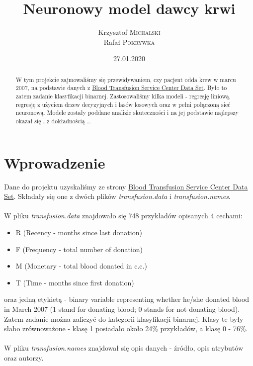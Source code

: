 \documentclass[11pt, a4paper, notitlepage]{report}
\author{Krzysztof \textsc{Michalski} \\ Rafał \textsc{Pokrywka} }
\title{\textbf{Neuronowy model dawcy krwi}}
\date{27.01.2020}
\begin{document}
\clearpage\maketitle
\thispagestyle{empty}
\begin{abstract}
	W tym projekcie zajmowaliśmy się przewidywaniem, czy pacjent odda krew w marcu 2007, na podstawie danych z \href{https://archive.ics.uci.edu/ml/datasets/Blood+Transfusion+Service+Center/}{Blood Transfusion Service Center Data Set}.
	Było to zatem zadanie klasyfikacji binarnej. Zastosowaliśmy kilka modeli - regresję liniową, regresję z użyciem drzew decyzyjnych i lasów losowych oraz w pełni połączoną sieć neuronową. Modele zostały poddane analizie skuteczności i na jej podstawie
	najlepszy okazał się \ldots z dokładnością \ldots
\end{abstract}

\clearpage \tableofcontents
\thispagestyle{empty}

\setcounter{page}{1}

\chapter{Wprowadzenie}
	Dane do projektu uzyskaliśmy ze strony \href{https://archive.ics.uci.edu/ml/datasets/Blood+Transfusion+Service+Center/}{Blood Transfusion Service Center Data Set}. Składały się one z dwóch plików {\it transfusion.data} i {\it transfusion.names}.\\ \\
	W pliku  {\it transfusion.data} znajdowało się 748 przykładów opisanych 4 cechami:
	\begin{itemize}
	  \item R (Recency - months since last donation)
	  \item F (Frequency - total number of donation)
	  \item M (Monetary - total blood donated in c.c.)
	 \item T (Time - months since first donation)
	\end{itemize} oraz jedną etykietą - binary variable representing whether he/she donated blood in March 2007 (1 stand for donating blood; 0 stands for not donating blood). Zatem zadanie można zaliczyć do kategorii klasyfikacji binarnej. Klasy te były słabo zrównoważone - klasę 1
	posiadało około 24\% przykładów, a klasę 0 - 76\%.\\ \\
	W pliku {\it transfusion.names} znajdował się opis danych - źródło, opis atrybutów oraz autorzy.
\end{document}
